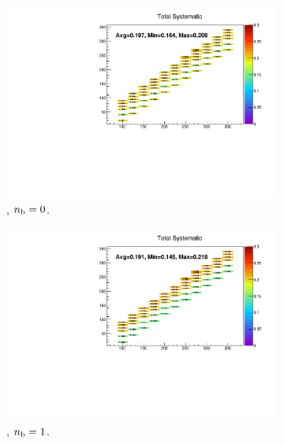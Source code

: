 \begin{figure}[h!]
  \centering
  \begin{subfigure}[b]{0.47\textwidth}
    \includegraphics[width=\textwidth]{Figs/sms/t2cc/v37_3/systs/total_T2cc_eq0b_le3j_incl.pdf}
    \caption{\njlow, $n_{\text{b}} = 0$.}
  \end{subfigure}
  \begin{subfigure}[b]{0.47\textwidth}
    \includegraphics[width=\textwidth]{Figs/sms/t2cc/v37_3/systs/total_T2cc_eq1b_le3j_incl.pdf}
    \caption{\njlow, $n_{\text{b}} = 1$.}
  \end{subfigure}\\
  \begin{subfigure}[b]{0.47\textwidth}

\end{subfigure}
\end{figure}

